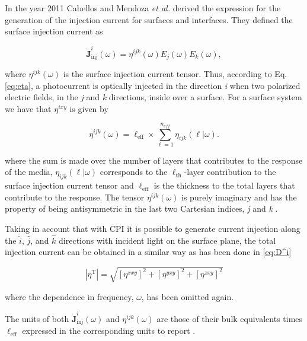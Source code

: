 \documentclass[aps,pra,11pt,tightenlines,showpacs,superscriptaddress,groupedaddress]{revtex4-1}
\newcommand{\ea}{$\eta^{ixy}$}
\begin{document}
In the year 2011 Cabellos and Mendoza \emph{et al.} \cite{cabellos2011optical}
derived the expression for the generation of the injection current for surfaces
and interfaces. They defined the surface injection current as

\begin{equation}
    \mathbf{\dot{J}}^{i}_{\text{inj}}(\omega) =
    \eta^{ijk}(\omega)E_{j}(\omega)E_{k}(\omega), \label{eq:eta}
\end{equation}

\noindent where $\eta^{ijk}(\omega)$ is the surface injection current tensor.
Thus, according to Eq. \ref{eq:eta}, a photocurrent is optically injected in
the direction \emph{i} when two polarized electric fields, in the \emph{j} and
\emph{k} directions, inside over a surface. For a surface system we have that
{\ea} is given by \cite{cabellos2011optical, arzate2014optical}

\begin{equation}
    \eta^{ijk} (\omega) = \ell_{\text{eff}} \times \sum_{\ell=1}^{n_{eff}}
    \eta_{ijk} (\ell|\omega). \label{eq:etaeff}
\end{equation}

\noindent where the sum is made over the number of layers that contributes to
the response of the media, $\eta_{ijk} (\ell|\omega)$ corresponds to the
$\ell_{\text{th}}$-layer contribution to the surface injection current tensor
and $\ell_{\text{eff}}$ is the thickness to the total layers that contribute to
the response. The tensor $\eta^{ijk}(\omega)$ is purely imaginary and has the
property of being antisymmetric in the last two Cartesian indices, \emph{j} and
\emph{k} \cite{sipe2000second,nastos2006optical}.

Taking in account that with CPI it is possible to generate current injection
along the $\hat{i}$, $\hat{j}$, and $\hat{k}$ directions with incident light on
the surface plane, the total injection current can be obtained in a similar way
as has been done in \ref{eq:D^i}

\begin{equation*}
    |{\eta^{\text{T}}}| = \sqrt{ \left[ \eta^{xxy} \right]^{2} + \left[
    \eta^{yxy} \right]^{2} + \left[ \eta^{zxy} \right]^{2} }
\end{equation*}

\noindent where the dependence in frequency, $\omega$, has been omitted again.

The units of both $\mathbf{\dot{J}}^{i}_{\text{inj}}(\omega)$ and $\eta^{ijk}
(\omega)$  are those of their bulk equivalents times $\ell_{\text{eff}}$
expressed in the corresponding units to report \cite{cabellos2011optical}.
\end{document}
